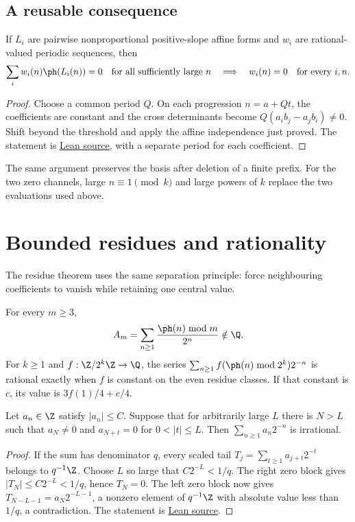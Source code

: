 \documentclass[11pt]{article}
\begin{document}
\subsection{A reusable consequence}
\begin{corollary}\label{cor:periodic-freezing}
If $L_i$ are pairwise nonproportional positive-slope affine forms and $w_i$
are rational-valued periodic sequences, then
\[
 \sum_i w_i(n)\ph(L_i(n))=0\quad\text{for all sufficiently large }n
 \quad\Longrightarrow\quad w_i(n)=0\quad\text{for every }i,n.
\]
\end{corollary}
\begin{proof}
Choose a common period $Q$. On each progression $n=a+Qt$, the coefficients
are constant and the cross determinants become $Q(a_ib_j-a_jb_i)\ne0$.
Shift beyond the threshold and apply the affine independence just proved.
The statement is \href{https://github.com/wcook04/plectis-erdos/blob/f36a98bf3d3e6f65f1074e3b800e3293d5b8a51a/ErdosProblems/Erdos249/PaperCompleteR7/PeriodicAndPulse.lean#L64}{Lean source},
with a separate period for each coefficient.
\end{proof}
The same argument preserves the basis after deletion of a finite prefix.
For the two zero channels, large $n\equiv1\pmod k$ and large powers of $k$
replace the two evaluations used above.
\section{Bounded residues and rationality}\label{sec:family}
The residue theorem uses the same separation principle: force neighbouring
coefficients to vanish while retaining one central value.

\begin{theorem}\label{res:residueseries}
For every $m\ge3$,
\[
 A_m=\sum_{n\ge1}\frac{\ph(n)\bmod m}{2^n}\notin\Q.
\]
For $k\ge1$ and $f:\Z/2^k\Z\to\Q$, the series
$\sum_{n\ge1}f(\ph(n)\bmod2^k)2^{-n}$ is rational exactly when $f$ is
constant on the even residue classes. If that constant is $c$, its value is
$3f(1)/4+c/4$.
\end{theorem}

\begin{lemma}\label{lem:bounded-pulse}
Let $a_n\in\Z$ satisfy $|a_n|\le C$. Suppose that for arbitrarily large $L$
there is $N>L$ such that $a_N\ne0$ and
$a_{N+t}=0$ for $0<|t|\le L$. Then $\sum_{n\ge1}a_n2^{-n}$ is irrational.
\end{lemma}
\begin{proof}
If the sum has denominator $q$, every scaled tail
$T_j=\sum_{t\ge1}a_{j+t}2^{-t}$ belongs to $q^{-1}\Z$.
Choose $L$ so large that $C2^{-L}<1/q$.
The right zero block gives $|T_N|\le C2^{-L}<1/q$, hence $T_N=0$.
The left zero block now gives
$T_{N-L-1}=a_N2^{-L-1}$, a nonzero element of $q^{-1}\Z$ with absolute
value less than $1/q$, a contradiction. The statement is
\href{https://github.com/wcook04/plectis-erdos/blob/f36a98bf3d3e6f65f1074e3b800e3293d5b8a51a/ErdosProblems/Erdos249/PaperCompleteR7/PeriodicAndPulse.lean#L106}{Lean source}.
\end{proof}
\end{document}
